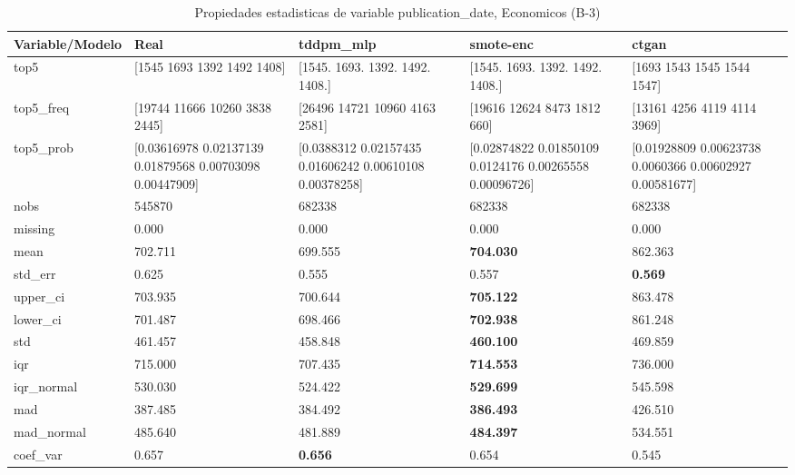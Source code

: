 \begin{table}[H]
\centering
\fontsize{8}{14}\selectfont
\caption{Propiedades  estadisticas de variable publication\_date, Economicos (B-3)}
\label{table-stats-economicos-b-3-publication_date}
\begin{tabular}{|l|m{10em}|m{10em}|m{10em}|m{10em}|}
\hline
 \rowcolor[gray]{0.8}
Variable/Modelo & Real & tddpm\_mlp & smote-enc & ctgan \\
\hline top5 & [1545 1693 1392 1492 1408] & [1545. 1693. 1392. 1492. 1408.] & [1545. 1693. 1392. 1492. 1408.] & [1693 1543 1545 1544 1547] \\
\hline top5\_freq & [19744 11666 10260  3838  2445] & [26496 14721 10960  4163  2581] & [19616 12624  8473  1812   660] & [13161  4256  4119  4114  3969] \\
\hline top5\_prob & [0.03616978 0.02137139 0.01879568 0.00703098 0.00447909] & [0.0388312  0.02157435 0.01606242 0.00610108 0.00378258] & [0.02874822 0.01850109 0.0124176  0.00265558 0.00096726] & [0.01928809 0.00623738 0.0060366  0.00602927 0.00581677] \\
\hline nobs & 545870 & 682338 & 682338 & 682338 \\
\hline missing & 0.000 & 0.000 & 0.000 & 0.000 \\
\hline mean & 702.711 & 699.555 & \bfseries 704.030 & \cellcolor[rgb]{0.9, 0.54, 0.52} 862.363 \\
\hline std\_err & 0.625 & \cellcolor[rgb]{0.9, 0.54, 0.52} 0.555 & 0.557 & \bfseries 0.569 \\
\hline upper\_ci & 703.935 & 700.644 & \bfseries 705.122 & \cellcolor[rgb]{0.9, 0.54, 0.52} 863.478 \\
\hline lower\_ci & 701.487 & 698.466 & \bfseries 702.938 & \cellcolor[rgb]{0.9, 0.54, 0.52} 861.248 \\
\hline std & 461.457 & 458.848 & \bfseries 460.100 & \cellcolor[rgb]{0.9, 0.54, 0.52} 469.859 \\
\hline iqr & 715.000 & 707.435 & \bfseries 714.553 & \cellcolor[rgb]{0.9, 0.54, 0.52} 736.000 \\
\hline iqr\_normal & 530.030 & 524.422 & \bfseries 529.699 & \cellcolor[rgb]{0.9, 0.54, 0.52} 545.598 \\
\hline mad & 387.485 & 384.492 & \bfseries 386.493 & \cellcolor[rgb]{0.9, 0.54, 0.52} 426.510 \\
\hline mad\_normal & 485.640 & 481.889 & \bfseries 484.397 & \cellcolor[rgb]{0.9, 0.54, 0.52} 534.551 \\
\hline coef\_var & 0.657 & \bfseries 0.656 & 0.654 & \cellcolor[rgb]{0.9, 0.54, 0.52} 0.545 \\

\end{tabular}
\end{table}
